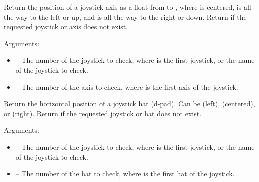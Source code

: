 \documentclass[letterpaper,10pt,english]{sphinxmanual}
\begin{document}
\begin{fulllineitems}
\label{joystick:sge.joystick.get_axis}
Return the position of a joystick axis as a float from  to
, where  is centered,  is all the way to the left or
up, and  is all the way to the right or down.  Return  if
the requested joystick or axis does not exist.

Arguments:
\begin{itemize}
\item {} 
 -- The number of the joystick to check, where 
is the first joystick, or the name of the joystick to check.

\item {} 
 -- The number of the axis to check, where  is the
first axis of the joystick.

\end{itemize}

\end{fulllineitems}


\begin{fulllineitems}
\label{joystick:sge.joystick.get_hat_x}
Return the horizontal position of a joystick hat (d-pad).  Can be
 (left),  (centered), or  (right).  Return  if
the requested joystick or hat does not exist.

Arguments:
\begin{itemize}
\item {} 
 -- The number of the joystick to check, where 
is the first joystick, or the name of the joystick to check.

\item {} 
 -- The number of the hat to check, where  is the
first hat of the joystick.

\end{itemize}

\end{fulllineitems}

\end{document}
